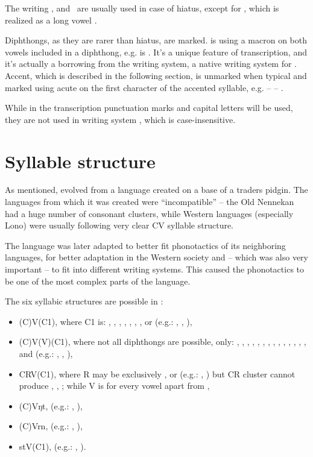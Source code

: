 \skipline

The writing ,  and~ are usually used in case of hiatus,
except for , which is realized as a long vowel .

Diphthongs, as they are rarer than hiatus, are marked.  is using
a macron on both vowels included in a diphthong, e.g.  is . It's a
unique feature of transcription, and it's actually a borrowing from the
 writing system, a native writing system for \andro. Accent, which
is described in the following section, is unmarked when typical and marked using
acute on the first character of the accented syllable, e.g. 
--  -- .

While in the transcription punctuation marks and capital letters will be used,
they are not used in writing system , which is case-insensitive.

\section{Syllable structure}

As mentioned, \andro evolved from a language created on a base of a traders
pidgin. The languages from which it was created were ``incompatible'' -- the Old
Nennekan had a huge number of consonant clusters, while Western languages
(especially Lono) were usually following very clear CV syllable structure.

The language was later adapted to better fit phonotactics of its neighboring
languages, for better adaptation in the Western society and -- which was also
very important -- to fit into different writing systems. This caused the
phonotactics to be one of the most complex parts of the language.

The six syllabic structures are possible in \andro:

\begin{itemize}
    \item (C)V(C1), where C1 is: , , , , , , ,  or  (e.g.: , , ),
    \item (C)V(V)(C1), where not all diphthongs are possible, only: , , , , , , , , , , , , , ,  and  (e.g.: , , ),
    \item CRV(C1), where R may be exclusively ,  or  (e.g.: , ) but CR cluster cannot produce , , ; while V is for every vowel apart from ,
    \item (C)Vŋt, (e.g.: , ),
    \item (C)Vrn, (e.g.: , ),
    \item stV(C1), (e.g.: , ).
\end{itemize}

